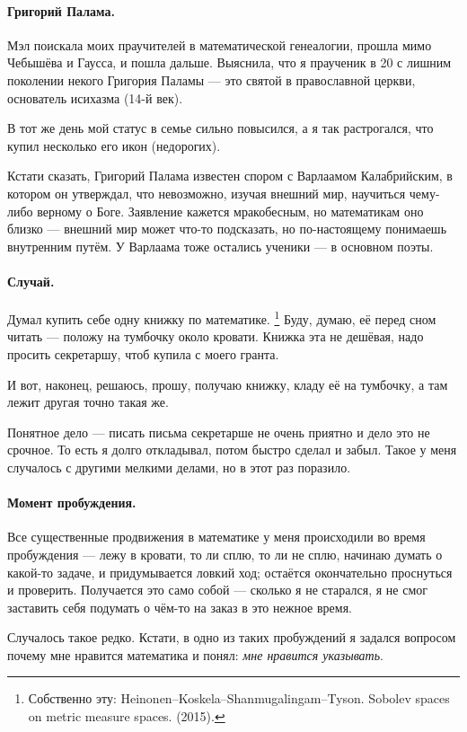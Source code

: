 \documentclass{book}
\begin{document}
\paragraph{Григорий Палама.}
Мэл поискала моих праучителей в математической генеалогии, прошла мимо Чебышёва и Гаусса, и пошла дальше.
Выяснила, что я праученик в 20 с лишним поколении некого Григория Паламы --- это святой в православной церкви, основатель исихазма (14-й век).

В тот же день мой статус в семье сильно повысился, а я так растрогался, что купил несколько его икон (недорогих).

Кстати сказать, Григорий Палама известен спором с Варлаамом Калабрийским, в котором он утверждал, что невозможно, изучая внешний мир, научиться чему-либо верному о Боге.
Заявление кажется мракобесным, но математикам оно близко --- внешний мир может что-то подсказать, но по-настоящему понимаешь внутренним путём.
У Варлаама тоже остались ученики --- в основном поэты.

\paragraph{Случай.}
Думал купить себе одну книжку по математике.%
\footnote{Собственно эту: Heinonen--Koskela--Shanmugalingam--Tyson.
Sobolev spaces on metric measure spaces. (2015).}
Буду, думаю, её перед сном читать --- положу на тумбочку около кровати.
Книжка эта не дешёвая, надо просить секретаршу, чтоб купила с моего гранта.

И вот, наконец, решаюсь, прошу, получаю книжку, кладу её на тумбочку, а там лежит другая точно такая же.

Понятное дело --- писать письма секретарше не очень приятно и дело это не срочное.
То есть я долго откладывал, потом быстро сделал и забыл.
Такое у меня случалось с другими мелкими делами, но в этот раз поразило.

\paragraph{Момент пробуждения.}
Все существенные продвижения в математике у меня происходили во время пробуждения ---
лежу в кровати, то ли сплю, то ли не сплю, начинаю думать о какой-то задаче, и придумывается ловкий ход; 
остаётся окончательно проснуться и проверить.
Получается это само собой --- сколько я не старался, я не смог заставить себя подумать о чём-то на заказ в это нежное время.

Случалось такое редко.
Кстати, в одно из таких пробуждений я задался вопросом почему мне нравится математика и понял: \textit{мне нравится указывать}.
\end{document}
